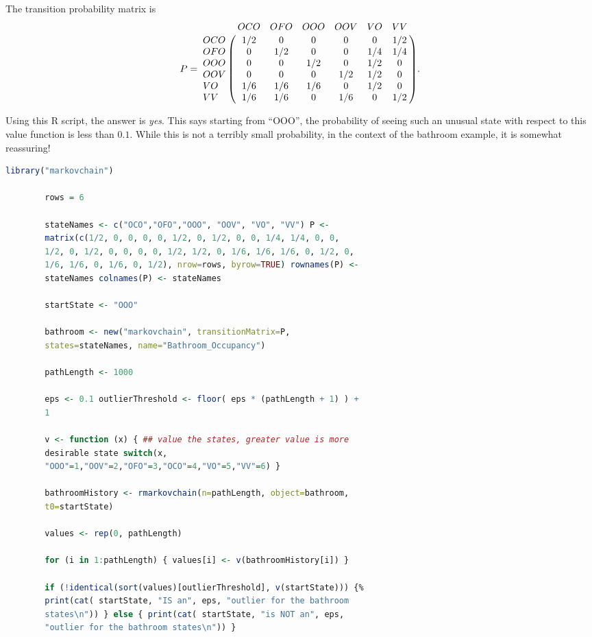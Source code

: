 \documentclass[12pt]{article}
\begin{document}
\begin{example}
\begin{exercise}
    The transition probability matrix is
    \[
        P= \bordermatrix{ & OCO & OFO & OOO & OOV & VO & VV \cr
        OCO & 1/2 & 0 & 0 & 0 & 0 & 1/2 \cr
        OFO & 0 & 1/2 & 0 & 0 & 1/4 & 1/4 \cr
        OOO & 0 & 0 & 1/2 & 0 & 1/2 & 0 \cr
        OOV & 0 & 0 & 0 & 1/2 & 1/2 & 0 \cr
        VO & 1/6 & 1/6 & 1/6 & 0 & 1/2 & 0 \cr
        VV & 1/6 & 1/6 & 0 & 1/6 & 0 & 1/2 \cr
        }.
    \]
\end{exercise}

\begin{solution}
    Using this R script, the answer is \emph{yes}.  This says starting
    from ``OOO'', the probability of seeing such an unusual state with
    respect to this value function is less than \( 0.1 \).  While this
    is not a terribly small probability, in the context of the bathroom
    example, it is somewhat reassuring!

    \begin{lstlisting}[language=R]
        library("markovchain")

        rows = 6

        stateNames <- c("OCO","OFO","OOO", "OOV", "VO", "VV") P <-
        matrix(c(1/2, 0, 0, 0, 0, 1/2, 0, 1/2, 0, 0, 1/4, 1/4, 0, 0,
        1/2, 0, 1/2, 0, 0, 0, 0, 1/2, 1/2, 0, 1/6, 1/6, 1/6, 0, 1/2, 0,
        1/6, 1/6, 0, 1/6, 0, 1/2), nrow=rows, byrow=TRUE) rownames(P) <-
        stateNames colnames(P) <- stateNames

        startState <- "OOO"

        bathroom <- new("markovchain", transitionMatrix=P,
        states=stateNames, name="Bathroom_Occupancy")

        pathLength <- 1000

        eps <- 0.1 outlierThreshold <- floor( eps * (pathLength + 1) ) +
        1

        v <- function (x) { ## value the states, greater value is more
        desirable state switch(x,
        "OOO"=1,"OOV"=2,"OFO"=3,"OCO"=4,"VO"=5,"VV"=6) }

        bathroomHistory <- rmarkovchain(n=pathLength, object=bathroom,
        t0=startState)

        values <- rep(0, pathLength)

        for (i in 1:pathLength) { values[i] <- v(bathroomHistory[i]) }

        if (!identical(sort(values)[outlierThreshold], v(startState))) {%
        print(cat( startState, "IS an", eps, "outlier for the bathroom
        states\n")) } else { print(cat( startState, "is NOT an", eps,
        "outlier for the bathroom states\n")) }
    \end{lstlisting}


\end{solution}
\end{example}
\end{document}
